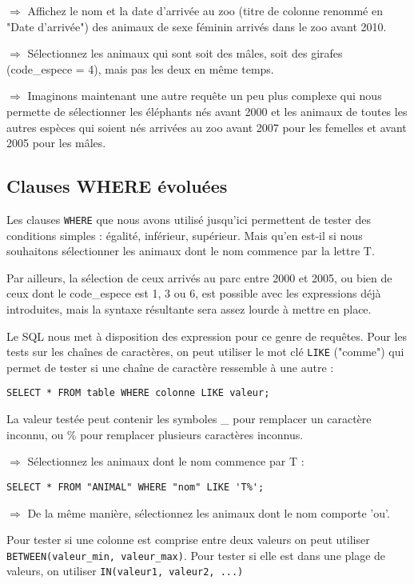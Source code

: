 \documentclass[11pt]{article}
\begin{document}
				$\Rightarrow$ Affichez le nom et la date d'arrivée au zoo (titre de colonne renommé en "Date d'arrivée") des animaux de sexe féminin arrivés dans le zoo avant 2010.
				
				$\Rightarrow$ Sélectionnez les animaux qui sont soit des mâles, soit des girafes (code\_espece = 4), mais pas les deux en même temps.
				
				$\Rightarrow$ Imaginons maintenant une autre requête un peu plus complexe qui nous permette de sélectionner les éléphants nés avant 2000 et les animaux de toutes les autres espèces qui soient nés arrivées au zoo avant 2007 pour les femelles et avant 2005 pour les mâles.
				
			\subsection{Clauses WHERE évoluées}
				Les clauses \lstinline{WHERE} que nous avons utilisé jusqu'ici permettent de tester des conditions simples : égalité, inférieur, supérieur. Mais qu'en est-il si nous souhaitons sélectionner les animaux dont le nom commence par la lettre T. 

				Par ailleurs, la sélection de ceux arrivés au parc entre 2000 et 2005, ou bien de ceux dont le code\_espece est 1, 3 ou 6, est possible avec les expressions déjà introduites, mais la syntaxe résultante sera assez lourde à mettre en place.
				
				Le SQL nous met à disposition des expression pour ce genre de requêtes. Pour les tests sur les chaînes de caractères, on peut utiliser le mot clé \lstinline{LIKE} ("comme") qui permet de tester si une chaîne de caractère ressemble à une autre :
				\begin{lstlisting}
SELECT * FROM table WHERE colonne LIKE valeur;				
				\end{lstlisting}
				
				La valeur testée peut contenir les symboles \_ pour remplacer un caractère inconnu, ou \% pour remplacer plusieurs caractères inconnus.
				
				$\Rightarrow$ Sélectionnez les animaux dont le nom commence par T :
				\begin{lstlisting}
SELECT * FROM "ANIMAL" WHERE "nom" LIKE 'T%';				
				\end{lstlisting}
			
				$\Rightarrow$ De la même manière, sélectionnez les animaux dont le nom comporte 'ou'.
				
				Pour tester si une colonne est comprise entre deux valeurs on peut utiliser \lstinline{BETWEEN(valeur_min, valeur_max)}. Pour tester si elle est dans une plage de valeurs, on utiliser \lstinline{IN(valeur1, valeur2, ...)}
				
\end{document}
